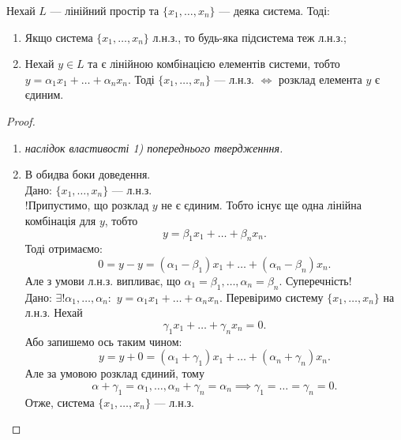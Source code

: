 \documentclass{math_library}
\begin{document}
	\begin{proposition}
	Нехай $L$ --- лінійний простір та $\{x_1,\dots,x_n\}$ --- деяка система. Тоді:
	\begin{enumerate}[nosep, wide = 0pt, label={\arabic*)}]
	\item Якщо система $\{x_1, \dots, x_n\}$ л.н.з., то будь-яка підсистема теж л.н.з.;
	\item Нехай $y \in L$ та є лінійною комбінацією елементів системи, тобто $y = \alpha_1 x_1 + \dots + \alpha_n x_n$. Тоді $\{x_1, \dots, x_n\}$ --- л.н.з. $\iff$ розклад елемента $y$ є єдиним.
	\end{enumerate}
	\end{proposition}
	
	\begin{proof}
	\leavevmode
	\begin{enumerate}[topsep=0pt, wide=0pt, label={\arabic*)}]
	\item \textit{наслідок властивості 1) попереднього твердженння.}
	\item В обидва боки доведення.\\
	\rightproof Дано: $\{x_1, \dots, x_n \}$ --- л.н.з.\\
	!Припустимо, що розклад $y$ не є єдиним. Тобто існує ще одна лінійна комбінація для $y$, тобто 
	\[
	y = \beta_1 x_1 + \dots + \beta_n x_n.
	\]
	Тоді отримаємо:
	\[
	0 = y - y = (\alpha_1 - \beta_1)x_1 + \dots + (\alpha_n - \beta_n)x_n.
	\]
	Але з умови л.н.з. випливає, що $\alpha_1 = \beta_1, \dots, \alpha_n = \beta_n$. Суперечність!
	\bigskip \\
	\leftproof Дано: $\exists! \alpha_1, \dots, \alpha_n:$
	$y = \alpha_1 x_1 + \dots + \alpha_n x_n$. Перевіримо систему $\{x_1, \dots, x_n\}$ на л.н.з. Нехай
	\[
	\gamma_1 x_1 + \dots + \gamma_n x_n = 0.
	\]
	Або запишемо ось таким чином:
	\[
	y = y + 0 = (\alpha_1 + \gamma_1)x_1 + \dots + (\alpha_n + \gamma_n)x_n.
	\]
	Але за умовою розклад єдиний, тому 
	\[
	\alpha + \gamma_1 = \alpha_1, \dots, \alpha_n + \gamma_n = \alpha_n \implies \gamma_1 = \dots = \gamma_n = 0.
	\]
	Отже, система $\{x_1,\dots,x_n\}$ --- л.н.з. \qedhere
	\end{enumerate}
	\end{proof}
	
\end{document}
